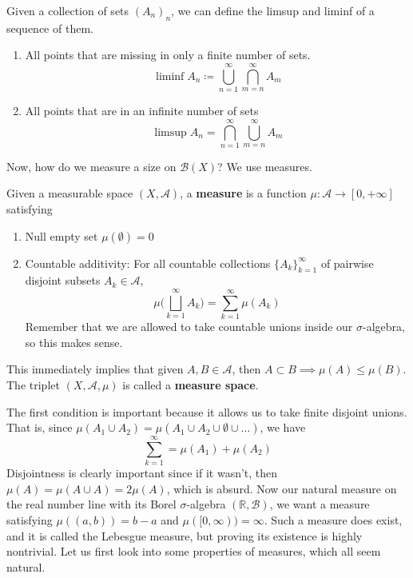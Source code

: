   \begin{definition}
    Given a collection of sets $(A_n)_n$, we can define the limsup and liminf of a sequence of them. 
    \begin{enumerate}
      \item All points that are missing in only a finite number of sets. 
        \begin{equation}
          \liminf A_n \coloneqq \bigcup_{n=1}^\infty \bigcap_{m=n}^\infty A_m 
        \end{equation}

      \item All points that are in an infinite number of sets 
        \begin{equation}
          \limsup A_n = \bigcap_{n=1}^\infty \bigcup_{m=n}^\infty A_m 
        \end{equation}
    \end{enumerate}
  \end{definition}

  Now, how do we measure a size on $\mathcal{B}(X)$? We use measures. 

  \begin{definition}[Measure]
    Given a measurable space $(X, \mathcal{A})$, a \textbf{measure} is a function $\mu : \mathcal{A} \longrightarrow [0, +\infty]$ satisfying 
    \begin{enumerate}
      \item Null empty set $\mu(\emptyset) = 0$ 
      \item Countable additivity: For all countable collections $\{A_k\}_{k=1}^\infty$ of pairwise disjoint subsets $A_k \in \mathcal{A}$, 
      \begin{equation}
        \mu \bigg( \bigsqcup_{k=1}^\infty A_k \bigg) = \sum_{k=1}^\infty \mu(A_k)
      \end{equation}
      Remember that we are allowed to take countable unions inside our $\sigma$-algebra, so this makes sense. 
    \end{enumerate}
    This immediately implies that given $A, B \in \mathcal{A}$, then $A \subset B \implies \mu(A) \leq \mu(B)$. The triplet $(X, \mathcal{A}, \mu)$ is called a \textbf{measure space}. 
  \end{definition}

  The first condition is important because it allows us to take finite disjoint unions. That is, since $\mu(A_1 \cup A_2) = \mu(A_1 \cup A_2 \cup \emptyset \cup \ldots)$, we have 
  \begin{equation}
    \sum_{k=1}^\infty = \mu(A_1) + \mu(A_2)
  \end{equation}
  Disjointness is clearly important since if it wasn't, then $\mu(A) = \mu(A \cup A) = 2 \mu(A)$, which is absurd. Now our natural measure on the real number line with its Borel $\sigma$-algebra $(\mathbb{R}, \mathcal{B})$, we want a measure satisfying $\mu((a, b)) = b - a$ and $\mu([0, \infty)) = \infty$. Such a measure does exist, and it is called the Lebesgue measure, but proving its existence is highly nontrivial. Let us first look into some properties of measures, which all seem natural. 

